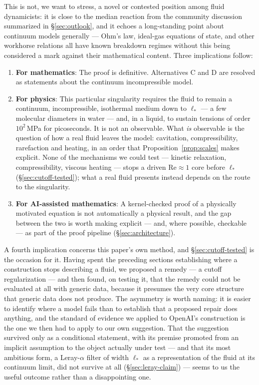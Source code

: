 \documentclass[11pt,a4paper]{article}
\begin{document}
This is not, we want to stress, a novel or contested position among fluid dynamicists: it is close
to the median reaction from the community discussion summarized in \S\ref{sec:outlook}, and it
echoes a long-standing point about continuum models generally --- Ohm's law, ideal-gas equations of
state, and other workhorse relations all have known breakdown regimes without this being considered
a mark against their mathematical content. Three implications follow:
\begin{enumerate}
  \item \textbf{For mathematics}: The proof is definitive. Alternatives C and D are resolved as
        statements about the continuum incompressible model.
  \item \textbf{For physics}: This particular singularity requires the fluid to remain a
        continuum, incompressible, isothermal medium down to $\ell_*$ --- a few molecular
        diameters in water --- and, in a liquid, to sustain tensions of order $10^2$\,MPa for
        picoseconds. It is not an observable. What \emph{is} observable is the question of how a
        real fluid leaves the model: cavitation, compressibility, rarefaction and heating, in an
        order that Proposition~\ref{prop:scales} makes explicit. None of the mechanisms we could
        test --- kinetic relaxation, compressibility, viscous heating --- stops a driven
        $\mathrm{Re}\approx1$ core before $\ell_*$ (\S\ref{sec:cutoff-tested}); what a real fluid
        presents instead depends on the route to the singularity.
  \item \textbf{For AI-assisted mathematics}: A kernel-checked proof of a physically motivated
        equation is not automatically a physical result, and the gap between the two is worth
        making explicit --- and, where possible, checkable --- as part of the proof pipeline
        (\S\ref{sec:architecture}).
\end{enumerate}

A fourth implication concerns this paper's own method, and \S\ref{sec:cutoff-tested} is the
occasion for it. Having spent the preceding sections establishing where a construction stops
describing a fluid, we proposed a remedy --- a cutoff regularization --- and then found, on
testing it, that the remedy could not be evaluated at all with generic data, because it presumes
the very core structure that generic data does not produce. The asymmetry is worth naming: it is
easier to identify where a model fails than to establish that a proposed repair does anything, and
the standard of evidence we applied to OpenAI's construction is the one we then had to apply to our
own suggestion. That the suggestion survived only as a conditional statement, with its premise
promoted from an implicit assumption to the object actually under test --- and that its most
ambitious form, a Leray-$\alpha$ filter of width $\ell_*$ as a representation of the fluid at its
continuum limit, did not survive at all (\S\ref{sec:leray-claim}) --- seems to us the useful outcome
rather than a disappointing one.
\end{document}

